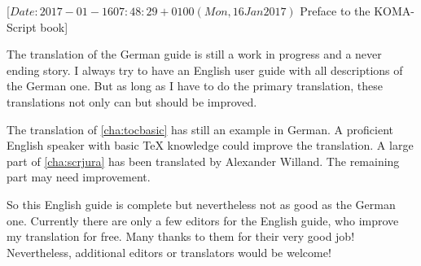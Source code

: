 %
%
%
%
%
%
%
%
%

                 [$Date: 2017-01-16 07:48:29 +0100 (Mon, 16 Jan 2017) $
                  Preface to the KOMA-Script book]



The translation of the German \KOMAScript{} guide is still a work in progress
and a never ending story. I always try to have an English user guide with all
descriptions of the German one. But as long as I have to do the primary
translation, these translations not only can but should be improved.

The translation of \autoref{cha:tocbasic} has still an example in German. A
proficient English speaker with basic TeX knowledge could improve the
translation. A large part of \autoref{cha:scrjura} has been translated by
Alexander Willand. The remaining part may need improvement.

So this English guide is complete but nevertheless not as good as the German
one. Currently there are only a few editors for the English guide, who improve
my translation for free. Many thanks to them for their very good job!
Nevertheless, additional editors or translators would be welcome!

\endinput


